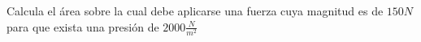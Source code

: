 
\question Calcula el área sobre la cual debe aplicarse una fuerza cuya
magnitud es de $150 N$ para que exista una presión de $2000 \frac{N}{m^2}$

